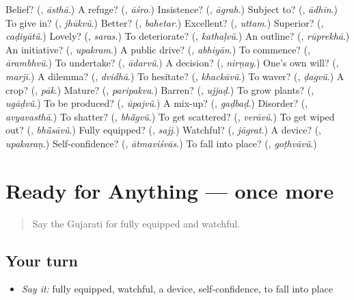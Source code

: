 \begin{tcolorbox}[breakable,colback=teal!4,colframe=teal!35!black,title={Before you move on}]
Belief? (\textbf{}, \emph{āsthā}.) A refuge? (\textbf{}, \emph{āśro}.) Insistence? (\textbf{}, \emph{āgrah}.) Subject to? (\textbf{}, \emph{ādhīn}.) To give in? (\textbf{}, \emph{jhūkvũ}.) Better? (\textbf{}, \emph{bahetar}.) Excellent? (\textbf{}, \emph{uttam}.) Superior? (\textbf{}, \emph{caḍiyātũ}.) Lovely? (\textbf{}, \emph{saras}.) To deteriorate? (\textbf{}, \emph{kathaḷvũ}.) An outline? (\textbf{}, \emph{rūprekhā}.) An initiative? (\textbf{}, \emph{upakram}.) A public drive? (\textbf{}, \emph{abhiyān}.) To commence? (\textbf{}, \emph{ārambhvũ}.) To undertake? (\textbf{}, \emph{ādarvũ}.) A decision? (\textbf{}, \emph{nirṇay}.) One's own will? (\textbf{}, \emph{marjī}.) A dilemma? (\textbf{}, \emph{dvidhā}.) To hesitate? (\textbf{}, \emph{khackāvũ}.) To waver? (\textbf{}, \emph{ḍagvũ}.) A crop? (\textbf{}, \emph{pāk}.) Mature? (\textbf{}, \emph{paripakva}.) Barren? (\textbf{}, \emph{ujjaḍ}.) To grow plants? (\textbf{}, \emph{ugāḍvũ}.) To be produced? (\textbf{}, \emph{ūpajvũ}.) A mix-up? (\textbf{}, \emph{gaḍbaḍ}.) Disorder? (\textbf{}, \emph{avyavasthā}.) To shatter? (\textbf{}, \emph{bhā̃gvũ}.) To get scattered? (\textbf{}, \emph{verāvũ}.) To get wiped out? (\textbf{}, \emph{bhū̃sāvũ}.) Fully equipped? (\textbf{}, \emph{sajj}.) Watchful? (\textbf{}, \emph{jāgrat}.) A device? (\textbf{}, \emph{upakaraṇ}.) Self-confidence? (\textbf{}, \emph{ātmaviśvās}.) To fall into place? (\textbf{}, \emph{goṭhvāvũ}.)
\end{tcolorbox}
\section[(dialogue)]{Ready for Anything — once more}

\label{lesson:GU-R392-review-final-392}



\begin{quote}
Say the Gujarati for fully equipped and watchful.
\end{quote}

\subsection*{Your turn}
\begin{itemize}
\raggedright
  \item \emph{Say it:} fully equipped, watchful, a device, self-confidence, to fall into place
\end{itemize}

